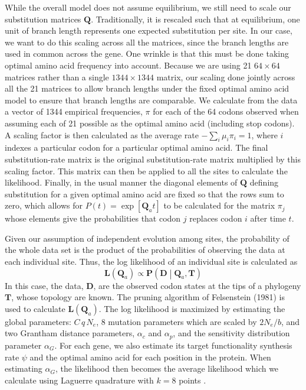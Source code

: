 \documentclass{article}
\newcommand{\Ne}{\ensuremath{{N_e}}\xspace} %
\newcommand{\Pij}{\ensuremath{\pi_{j}}\xspace}
\newcommand{\Pmatrix}{\mathbf{P}\xspace}
\newcommand{\Tmatrix}{\mathbf{T}\xspace}
\newcommand{\Dmatrix}{\mathbf{D}\xspace}
\newcommand{\Lmatrix}{\mathbf{L}\xspace}
\newcommand{\Qmatrix}{\mathbf{Q}\xspace}
\newcommand{\Qmatrixa}{\ensuremath{\Qmatrix_a}\xspace}
\newcommand{\alphac}{\ensuremath{\alpha_c}\xspace}
\newcommand{\alphag}{\ensuremath{\alpha_G}\xspace}
\newcommand{\alphap}{\ensuremath{\alpha_p}\xspace}
\begin{document}
While the overall model does not assume equilibrium, we still need to scale our substitution matrices $\Qmatrix$.
Traditionally, it is rescaled such that at equilibrium, one unit of branch length represents one expected substitution per site.
In our case, we want to do this scaling across all the matrices, since the branch lengths are used in common across the gene.
One wrinkle is that this must be done taking optimal amino acid frequency into account. 
Because we are using 21 $64 \times 64$ matrices rather than a single $1344 \times 1344$ matrix, our scaling done jointly across all the 21 matrices to allow branch lengths under the fixed optimal amino acid model to ensure that branch lengths are comparable.
We calculate from the data a vector of 1344 empirical frequencies, $\pi$ for each of the 64 codons observed when assuming each of 21 possible as the optimal amino acid (including stop codons).
A scaling factor is then calculated as the average rate $-\sum_i \mu_i \pi_i=1$, where $i$ indexes a particular codon for a particular optimal amino acid.
The final substitution-rate matrix is the original substitution-rate matrix multiplied by this scaling factor.
This matrix can then be applied to all the sites to calculate the likelihood. 
Finally, in the usual manner the diagonal elements of $\Qmatrix$ defining substitution for a given optimal amino acid are fixed so that the rows sum to zero, which allows for $P(t) = \exp\left[\Qmatrixa t\right]$ to be calculated for the matrix $\Pij$ whose elements give the probabilities that codon $j$ replaces codon $i$ after time $t$. 

Given our assumption of independent evolution among sites, the probability of the whole data set is the product of the probabilities of observing the data at each individual site. 
Thus, the log likelihood of an individual site is calculated as 
\begin{equation}
\Lmatrix\left(\Qmatrixa\right) \propto \Pmatrix\left(\Dmatrix\middle|\Qmatrixa,\Tmatrix\right)
\end{equation}
In this case, the data, $\Dmatrix$, are the observed codon states at the tips of a phylogeny $\Tmatrix$, whose topology are known. 
The pruning algorithm of Felsenstein (1981) is used to calculate $\Lmatrix(\Qmatrixa)$. 
The log likelihood is maximized by estimating the global parameters: $C \, q \, \Ne$, 8 mutation parameters which are scaled by $2 \Ne/b$, and two Grantham distance parameters, $\alphac$ and $\alphap$, and the sensitivity distribution parameter \alphag.
For each gene, we also estimate its target functionality synthesis rate $\psi$  and the optimal amino acid for each position in the protein. 
When estimating \alphag, the likelihood then becomes the average likelihood which we calculate using Laguerre quadrature with $k = 8$ points  \citep{Yang1994,Felsenstein2001}.





\end{document}
